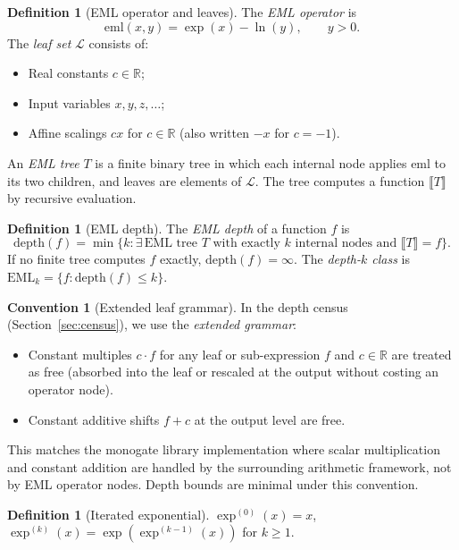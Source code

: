 \documentclass[12pt,a4paper]{article}
\theoremstyle{definition}
\newtheorem{definition}[theorem]{Definition}
\newtheorem{convention}[theorem]{Convention}
\theoremstyle{remark}
\begin{document}
\begin{definition}[EML operator and leaves]\label{def:eml}
The \emph{EML operator} is
\[
  \mathrm{eml}(x,y) = \exp(x) - \ln(y), \qquad y > 0.
\]
The \emph{leaf set} $\mathcal{L}$ consists of:
\begin{itemize}
  \item Real constants $c \in \mathbb{R}$;
  \item Input variables $x, y, z, \ldots$;
  \item Affine scalings $cx$ for $c \in \mathbb{R}$ (also written $-x$ for $c=-1$).
\end{itemize}
An \emph{EML tree} $T$ is a finite binary tree in which each internal node
applies $\mathrm{eml}$ to its two children, and leaves are elements of $\mathcal{L}$.
The tree computes a function $\llbracket T\rrbracket$ by recursive evaluation.
\end{definition}

\begin{definition}[EML depth]\label{def:depth}
The \emph{EML depth} of a function $f$ is
\[
  \mathrm{depth}(f) = \min\{k : \exists\,\text{EML tree }T\text{ with exactly }k
  \text{ internal nodes and }\llbracket T\rrbracket = f\}.
\]
If no finite tree computes $f$ exactly, $\mathrm{depth}(f) = \infty$.
The \emph{depth-$k$ class} is $\mathrm{EML}_k = \{f : \mathrm{depth}(f) \leq k\}$.
\end{definition}

\begin{convention}[Extended leaf grammar]\label{conv:grammar}
In the depth census (Section~\ref{sec:census}), we use the \emph{extended grammar}:
\begin{itemize}
  \item Constant multiples $c \cdot f$ for any leaf or sub-expression $f$ and
        $c \in \mathbb{R}$ are treated as free (absorbed into the leaf or rescaled
        at the output without costing an operator node).
  \item Constant additive shifts $f + c$ at the output level are free.
\end{itemize}
This matches the monogate library implementation where scalar multiplication
and constant addition are handled by the surrounding arithmetic framework,
not by EML operator nodes.  Depth bounds are minimal under this convention.
\end{convention}

\begin{definition}[Iterated exponential]\label{def:iterexp}
$\exp^{(0)}(x) = x$, $\exp^{(k)}(x) = \exp(\exp^{(k-1)}(x))$ for $k \geq 1$.
\end{definition}
\end{document}
